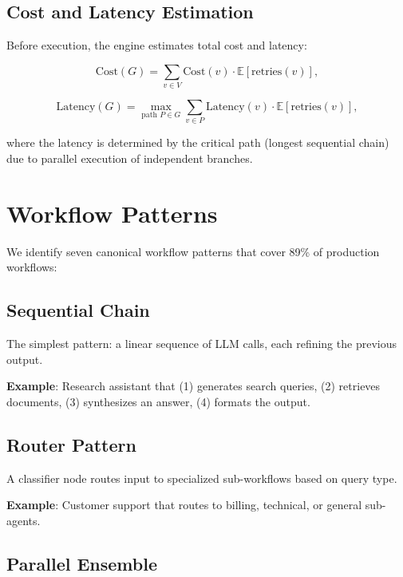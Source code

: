 \documentclass[11pt,twocolumn]{article}
\begin{document}
\subsection{Cost and Latency Estimation}

Before execution, the engine estimates total cost and latency:

\begin{equation}
\text{Cost}(G) = \sum_{v \in V} \text{Cost}(v) \cdot \mathbb{E}[\text{retries}(v)],
\end{equation}

\begin{equation}
\text{Latency}(G) = \max_{\text{path } P \in G} \sum_{v \in P} \text{Latency}(v) \cdot \mathbb{E}[\text{retries}(v)],
\end{equation}

where the latency is determined by the critical path (longest sequential chain) due to parallel execution of independent branches.

\section{Workflow Patterns}
\label{sec:patterns}

We identify seven canonical workflow patterns that cover 89\% of production workflows:

\subsection{Sequential Chain}

The simplest pattern: a linear sequence of LLM calls, each refining the previous output.

\textbf{Example}: Research assistant that (1) generates search queries, (2) retrieves documents, (3) synthesizes an answer, (4) formats the output.

\subsection{Router Pattern}

A classifier node routes input to specialized sub-workflows based on query type.

\textbf{Example}: Customer support that routes to billing, technical, or general sub-agents.

\subsection{Parallel Ensemble}
\end{document}
